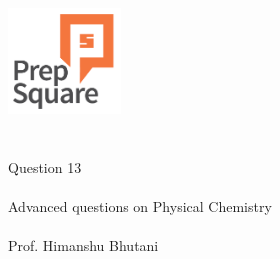 \documentclass{beamer}
\begin{document}
\begin{center}
\ \\ \ \\
\includegraphics[width=30mm]{Logo-final.png} \\
\ \\ \ \\ 
{\huge Question 13 \\ \ \\ }
{\Large
Advanced questions on Physical Chemistry
}
{\large \ \\ \ \\ Prof. Himanshu Bhutani }
\end{center}
\end{document}
